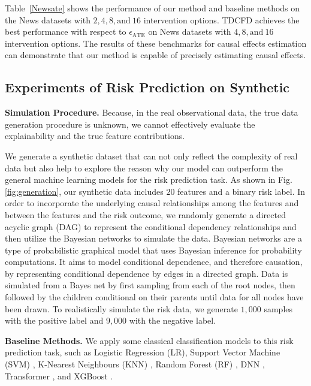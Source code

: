 \documentclass[letterpaper]{article} %
\theoremstyle{definition}
\theoremstyle{remark}
\begin{document}
Table~\ref{Newsate} shows the performance of our method and baseline methods on the News datasets with $2, 4, 8, \text{and} \ 16$ intervention options. TDCFD achieves the best performance with respect to $\epsilon_\text{ATE}$ on News datasets with $4, 8, \text{and} \ 16$ intervention options. The results of these benchmarks for causal effects estimation can demonstrate that our method is capable of precisely estimating causal effects.  


\subsection{Experiments of Risk Prediction on Synthetic}




\noindent\textbf{Simulation Procedure.} 
Because, in the real observational data, the true data generation procedure is unknown, we cannot effectively evaluate the explainability and the true feature contributions.

We generate a synthetic dataset that can not only reflect the complexity of real data but also help to explore the reason why our model can outperform the general machine learning models for the risk prediction task. As shown in Fig. \ref{fig:generation}, our synthetic data includes $20$ features and a binary risk label. In order to incorporate the underlying causal relationships among the features and between the features and the risk outcome, we randomly generate a directed acyclic graph (DAG) to represent the conditional dependency relationships and then utilize the Bayesian networks \cite{heckerman2008tutorial} to simulate the data. Bayesian networks are a type of probabilistic graphical model that uses Bayesian inference for probability computations. It aims to model conditional dependence, and therefore causation, by representing conditional dependence by edges in a directed graph. Data is simulated from a Bayes net by first sampling from each of the root nodes, then followed by the children conditional on their parents until data for all nodes have been drawn. To realistically simulate the risk data, we generate $1,000$ samples with the positive label and $9,000$ with the negative label.


\noindent\textbf{Baseline Methods.} We apply some classical classification models to this risk prediction task, such as Logistic Regression (LR), Support Vector Machine (SVM) \cite{suykens1999least}, K-Nearest Neighbours (KNN) \cite{cunningham2021k}, Random Forest (RF) \cite{breiman2001random}, DNN \cite{larochelle2009exploring}, Transformer \cite{vaswani2017attention}, and XGBoost \cite{chen2016xgboost}.
\end{document}
